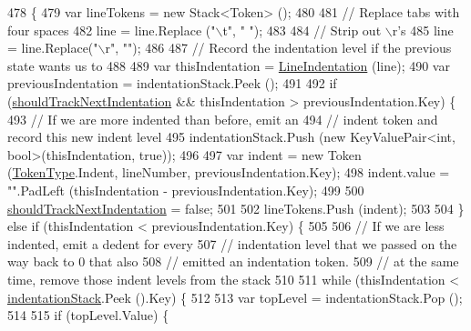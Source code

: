 \begin{DoxyCode}
478         \{
479             var lineTokens = \textcolor{keyword}{new} Stack<Token> ();
480 
481             \textcolor{comment}{// Replace tabs with four spaces}
482             line = line.Replace (\textcolor{stringliteral}{"\(\backslash\)t"}, \textcolor{stringliteral}{"    "});
483 
484             \textcolor{comment}{// Strip out \(\backslash\)r's}
485             line = line.Replace(\textcolor{stringliteral}{"\(\backslash\)r"}, \textcolor{stringliteral}{""});
486 
487             \textcolor{comment}{// Record the indentation level if the previous state wants us to}
488 
489             var thisIndentation = \hyperlink{a00061_a4079b10b099e5d85f5482f9e7eac4179}{LineIndentation} (line);
490             var previousIndentation = indentationStack.Peek ();
491 
492             \textcolor{keywordflow}{if} (\hyperlink{a00061_ac670aac2245cbd4694dfbd5b69313218}{shouldTrackNextIndentation} && thisIndentation > 
      previousIndentation.Key) \{
493                 \textcolor{comment}{// If we are more indented than before, emit an}
494                 \textcolor{comment}{// indent token and record this new indent level}
495                 indentationStack.Push (\textcolor{keyword}{new} KeyValuePair<int, bool>(thisIndentation, \textcolor{keyword}{true}));
496 
497                 var indent = \textcolor{keyword}{new} Token (\hyperlink{a00040_a301aa7c866593a5b625a8fc158bbeace}{TokenType}.Indent, lineNumber, previousIndentation.Key);
498                 indent.value = \textcolor{stringliteral}{""}.PadLeft (thisIndentation - previousIndentation.Key);
499 
500                 \hyperlink{a00061_ac670aac2245cbd4694dfbd5b69313218}{shouldTrackNextIndentation} = \textcolor{keyword}{false};
501 
502                 lineTokens.Push (indent);
503 
504             \} \textcolor{keywordflow}{else} \textcolor{keywordflow}{if} (thisIndentation < previousIndentation.Key) \{
505 
506                 \textcolor{comment}{// If we are less indented, emit a dedent for every}
507                 \textcolor{comment}{// indentation level that we passed on the way back to 0 that also}
508                 \textcolor{comment}{// emitted an indentation token.}
509                 \textcolor{comment}{// at the same time, remove those indent levels from the stack}
510 
511                 \textcolor{keywordflow}{while} (thisIndentation < \hyperlink{a00061_a6631a1b1a9109258ab18927e7587ff9b}{indentationStack}.Peek ().Key) \{
512 
513                     var topLevel = indentationStack.Pop ();
514 
515                     \textcolor{keywordflow}{if} (topLevel.Value) \{

\end{DoxyCode}
